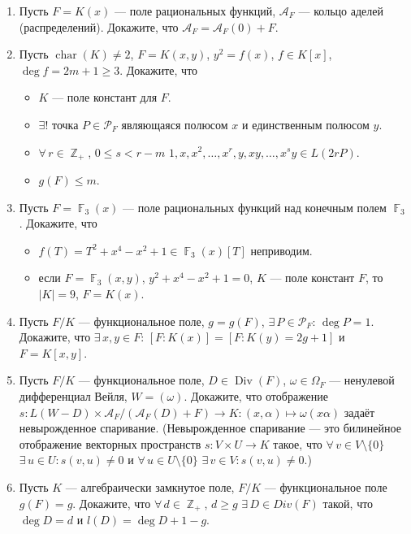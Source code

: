\documentclass[a4paper, 12pt]{article}
\DeclareMathOperator{\ZZ}{\mathbb{Z}}
\DeclareMathOperator{\FF}{\mathbb{F}}
\DeclareMathOperator{\Div}{Div}
\DeclareMathOperator{\chr}{char}
\begin{document}
\begin{enumerate}[noitemsep,topsep=0pt]
    \item Пусть $F=K(x)$ --- поле рациональных функций, $\mathcal{A}_F$ --- кольцо аделей (распределений). Докажите, что $\mathcal{A}_F=\mathcal{A}_F(0)+F$. %
    \item Пусть $\chr(K)\neq 2$, $F=K(x,y)$, $y^2=f(x)$, $f\in K[x]$, $\deg f = 2m+1\geqslant 3$. Докажите, что
    \begin{itemize}[noitemsep,topsep=0pt]
        \item $K$ --- поле констант для $F$.
        \item $\exists!$ точка $P\in\mathcal{P}_F$ являющаяся полюсом $x$ и единственным полюсом $y$.
        \item $\forall\, r\in\ZZ_{+}$, $0\leqslant s <r-m$ $1,x,x^2,\dots,x^r,y,xy,\dots,x^s y \in L(2r P)$.
        \item $g(F)\leqslant m$.
    \end{itemize} %
    \item Пусть $F=\FF_3(x)$ --- поле рациональных функций над конечным полем $\FF_3$. Докажите, что
    \begin{itemize}[noitemsep,topsep=0pt]
        \item $f(T)=T^2+x^4-x^2+1 \in \FF_3(x)[T]$ неприводим.
        \item если $F=\FF_3(x,y)$, $y^2+x^4-x^2+1=0$, $K$ --- поле констант $F$, то $|K|=9$, $F=K(x)$.
    \end{itemize} %
    \item Пусть $F/K$ --- функциональное поле, $g=g(F)$, $\exists\, P\in \mathcal{P}_F$: $\deg P = 1$. Докажите, что $\exists\, x,y\in F$: $[F:K(x)]=[F:K(y)=2g+1]$ и $F=K[x,y]$. %
    \item Пусть $F/K$ --- функциональное поле, $D\in\Div(F)$, $\omega\in\Omega_F$ --- ненулевой дифференциал Вейля, $W=(\omega)$. Докажите, что отображение $s:L(W-D) \times \mathcal{A}_F/(\mathcal{A}_F(D)+F) \rightarrow K: (x,\alpha) \mapsto \omega(x\alpha)$ задаёт невырожденное спаривание. (Невырожденное спаривание --- это билинейное отображение векторных пространств $s:V\times U \rightarrow K$ такое, что $\forall\,v\in V\setminus\{0\}$ $\exists\,u\in U: s(v,u)\neq 0$ и $\forall\,u\in U\setminus\{0\}$ $\exists\,v\in V: s(v,u)\neq 0$.) %
    \item Пусть $K$ --- алгебраически замкнутое поле, $F/K$ --- функциональное поле $g(F)=g$. Докажите, что $\forall\, d\in\ZZ_{+}$, $d\geqslant g$ $\exists\, D\in Div(F)$ такой, что $\deg D = d$ и $l(D)=\deg D +1 - g$. %

\end{enumerate}
\end{document}
